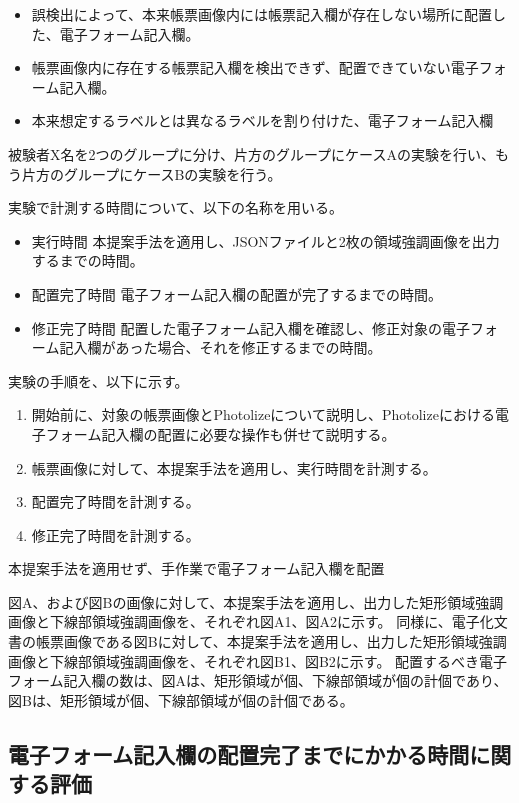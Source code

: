 \begin{itemize}
  \item 誤検出によって、本来帳票画像内には帳票記入欄が存在しない場所に配置した、電子フォーム記入欄。
  \item 帳票画像内に存在する帳票記入欄を検出できず、配置できていない電子フォーム記入欄。
  \item 本来想定するラベルとは異なるラベルを割り付けた、電子フォーム記入欄
\end{itemize}

被験者X名を2つのグループに分け、片方のグループにケースAの実験を行い、もう片方のグループにケースBの実験を行う。


実験で計測する時間について、以下の名称を用いる。

\begin{itemize}
  \item 実行時間
        本提案手法を適用し、JSONファイルと2枚の領域強調画像を出力するまでの時間。
  \item 配置完了時間
        電子フォーム記入欄の配置が完了するまでの時間。
  \item 修正完了時間
        配置した電子フォーム記入欄を確認し、修正対象の電子フォーム記入欄があった場合、それを修正するまでの時間。
\end{itemize}

実験の手順を、以下に示す。

\begin{enumerate}
  \item 開始前に、対象の帳票画像とPhotolizeについて説明し、Photolizeにおける電子フォーム記入欄の配置に必要な操作も併せて説明する。
  \item 帳票画像に対して、本提案手法を適用し、実行時間を計測する。
  \item 配置完了時間を計測する。
  \item 修正完了時間を計測する。
\end{enumerate}

本提案手法を適用せず、手作業で電子フォーム記入欄を配置



図A、および図Bの画像に対して、本提案手法を適用し、出力した矩形領域強調画像と下線部領域強調画像を、それぞれ図A1、図A2に示す。
同様に、電子化文書の帳票画像である図Bに対して、本提案手法を適用し、出力した矩形領域強調画像と下線部領域強調画像を、それぞれ図B1、図B2に示す。
配置するべき電子フォーム記入欄の数は、図Aは、矩形領域が個、下線部領域が個の計個であり、図Bは、矩形領域が個、下線部領域が個の計個である。

\subsection{電子フォーム記入欄の配置完了までにかかる時間に関する評価}\label{subsec:evalue_required_time}

